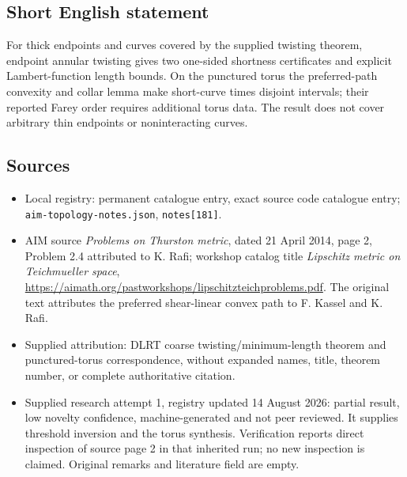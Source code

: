 \documentclass[11pt]{article}
\begin{document}
\subsection{Short English statement}
For thick endpoints and curves covered by the supplied twisting theorem, endpoint annular twisting gives two one-sided shortness certificates and explicit Lambert-function length bounds. On the punctured torus the preferred-path convexity and collar lemma make short-curve times disjoint intervals; their reported Farey order requires additional torus data. The result does not cover arbitrary thin endpoints or noninteracting curves.
\subsection{Sources}
\begin{itemize}
\item Local registry: permanent catalogue entry, exact source code catalogue entry; \texttt{aim-topology-notes.json}, \texttt{notes[181]}.
\item AIM source \emph{Problems on Thurston metric}, dated 21 April 2014, page 2, Problem 2.4 attributed to K. Rafi; workshop catalog title \emph{Lipschitz metric on Teichmueller space}, \url{https://aimath.org/pastworkshops/lipschitzteichproblems.pdf}. The original text attributes the preferred shear-linear convex path to F. Kassel and K. Rafi.
\item Supplied attribution: DLRT coarse twisting/minimum-length theorem and punctured-torus correspondence, without expanded names, title, theorem number, or complete authoritative citation.
\item Supplied research attempt 1, registry updated 14 August 2026: partial result, low novelty confidence, machine-generated and not peer reviewed. It supplies threshold inversion and the torus synthesis. Verification reports direct inspection of source page 2 in that inherited run; no new inspection is claimed. Original remarks and literature field are empty.
\end{itemize}
\end{document}
